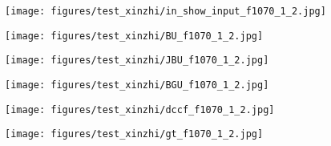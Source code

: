 \documentclass[runningheads]{llncs}
\begin{document}
    \begin{figure*}[!thb]
        \centering

        \begin{subfigure}[t]{0.15\linewidth}
            \centering
            \texttt{[image: figures/test\_xinzhi/in\_show\_input\_f1070\_1\_2.jpg]}
        \end{subfigure}
        \begin{subfigure}[t]{0.15\linewidth}
            \centering
            \texttt{[image: figures/test\_xinzhi/BU\_f1070\_1\_2.jpg]}
        \end{subfigure}
        \begin{subfigure}[t]{0.15\linewidth}
            \centering
            \texttt{[image: figures/test\_xinzhi/JBU\_f1070\_1\_2.jpg]}
        \end{subfigure}
        \begin{subfigure}[t]{0.15\linewidth}
            \centering
            \texttt{[image: figures/test\_xinzhi/BGU\_f1070\_1\_2.jpg]}
        \end{subfigure}
        \begin{subfigure}[t]{0.15\linewidth}
            \centering
            \texttt{[image: figures/test\_xinzhi/dccf\_f1070\_1\_2.jpg]}
        \end{subfigure}
        \begin{subfigure}[t]{0.15\linewidth}
            \centering
            \texttt{[image: figures/test\_xinzhi/gt\_f1070\_1\_2.jpg]}
        \end{subfigure}




\end{figure*}
\end{document}
